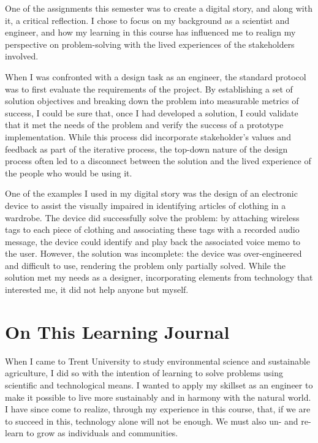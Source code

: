 \documentclass{report}
\begin{document}
\hspace{24pt} One of the assignments this semester was to create a digital story, and along with it, a critical reflection. I chose to focus on my background as a scientist and engineer, and how my learning in this course has influenced me to realign my perspective on problem-solving with the lived experiences of the stakeholders involved.

\hspace{24pt} When I was confronted with a design task as an engineer, the standard protocol was to first evaluate the requirements of the project. By establishing a set of solution objectives and breaking down the problem into measurable metrics of success, I could be sure that, once I had developed a solution, I could validate that it met the needs of the problem and verify the success of a prototype implementation. While this process did incorporate stakeholder's values and feedback as part of the iterative process, the top-down nature of the design process often led to a disconnect between the solution and the lived experience of the people who would be using it.

\hspace{24pt} One of the examples I used in my digital story was the design of an electronic device to assist the visually impaired in identifying articles of clothing in a wardrobe. The device did successfully solve the problem: by attaching wireless tags to each piece of clothing and associating these tags with a recorded audio message, the device could identify and play back the associated voice memo to the user. However, the solution was incomplete: the device was over-engineered and difficult to use, rendering the problem only partially solved. While the solution met my needs as a designer, incorporating elements from technology that interested me, it did not help anyone but myself.


\section{On This Learning Journal}

\hspace{24pt} When I came to Trent University to study environmental science and sustainable agriculture, I did so with the intention of learning to solve problems using scientific and technological means. I wanted to apply my skillset as an engineer to make it possible to live more sustainably and in harmony with the natural world. I have since come to realize, through my experience in this course, that, if we are to succeed in this, technology alone will not be enough. We must also un- and re-learn to grow as individuals and communities.
\end{document}
